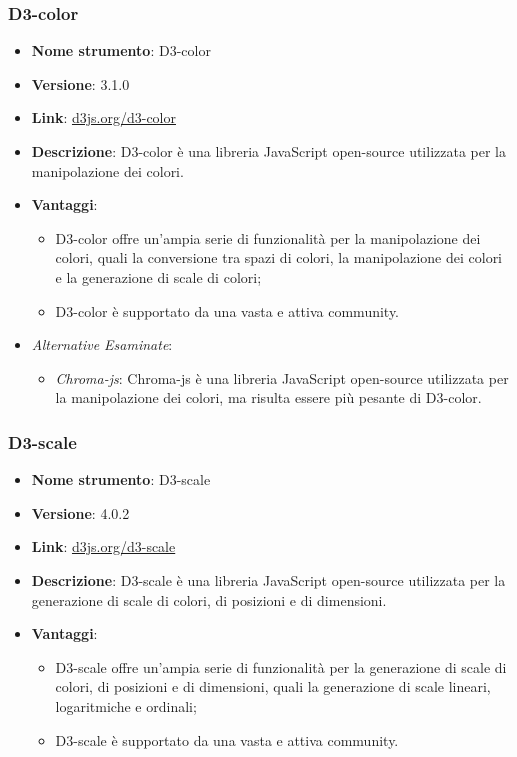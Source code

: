 \subsubsection{D3-color}
\begin{itemize}
      \item \textbf{Nome strumento}: D3-color
      \item \textbf{Versione}: 3.1.0
      \item \textbf{Link}: \href{https://d3js.org/d3-color}{d3js.org/d3-color}
      \item \textbf{Descrizione}: D3-color è una libreria JavaScript open-source utilizzata per la manipolazione dei colori.
      \item \textbf{Vantaggi}:
            \begin{itemize}
                  \item D3-color offre un'ampia serie di funzionalità per la manipolazione dei colori, quali la conversione tra spazi di colori, la manipolazione dei colori
                        e la generazione di scale di colori;
                  \item D3-color è supportato da una vasta e attiva community.
            \end{itemize}
      \item \textit{Alternative Esaminate}:
            \begin{itemize}
                  \item \textit{Chroma-js}: Chroma-js è una libreria JavaScript open-source utilizzata per la manipolazione dei colori, ma risulta essere più pesante di D3-color.
            \end{itemize}
\end{itemize}

\subsubsection{D3-scale}
\begin{itemize}
      \item \textbf{Nome strumento}: D3-scale
      \item \textbf{Versione}: 4.0.2
      \item \textbf{Link}: \href{https://d3js.org/d3-scale}{d3js.org/d3-scale}
      \item \textbf{Descrizione}: D3-scale è una libreria JavaScript open-source utilizzata per la generazione di scale di colori, di posizioni e di dimensioni.
      \item \textbf{Vantaggi}:
            \begin{itemize}
                  \item D3-scale offre un'ampia serie di funzionalità per la generazione di scale di colori, di posizioni e di dimensioni, quali la generazione di scale lineari,
                        logaritmiche e ordinali;
                  \item D3-scale è supportato da una vasta e attiva community.
            \end{itemize}
\end{itemize}

